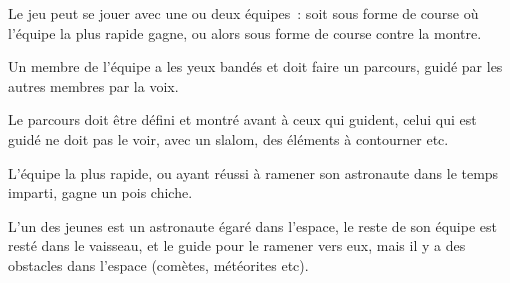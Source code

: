 \documentclass{grand-jeu}
\begin{document}
\begin{liste-materiel}
\end{liste-materiel}

\begin{regles}
Le jeu peut se jouer avec une ou deux équipes : soit sous forme de course où l’équipe la plus rapide gagne, ou alors sous forme de course contre la montre.

Un membre de l’équipe a les yeux bandés et doit faire un parcours, guidé par les autres membres par la voix.

Le parcours doit être défini et montré avant à ceux qui guident, celui qui est guidé ne doit pas le voir, avec un slalom, des éléments à contourner etc.

L’équipe la plus rapide, ou ayant réussi à ramener son astronaute dans le temps imparti, gagne un pois chiche.
\end{regles}

\begin{imaginaire}
L’un des jeunes est un astronaute égaré dans l’espace, le reste de son équipe est resté dans le vaisseau, et le guide pour le ramener vers eux, mais il y a des obstacles dans l’espace (comètes, météorites etc).
\end{imaginaire}

\begin{moments-stop}
\end{moments-stop}
\end{document}
